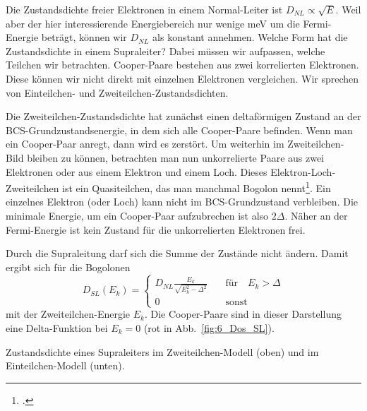 Die Zustandsdichte freier Elektronen in einem Normal-Leiter ist $D_{NL} \propto \sqrt{E}$. Weil aber der hier interessierende Energiebereich nur wenige meV um die Fermi-Energie beträgt, können wir $D_{NL}$ als konstant annehmen. Welche Form hat die Zustandsdichte in einem Supraleiter? Dabei müssen wir aufpassen, welche Teilchen wir betrachten. Cooper-Paare bestehen aus zwei korrelierten Elektronen. Diese können wir nicht direkt mit einzelnen Elektronen vergleichen. Wir sprechen von Einteilchen- und Zweiteilchen-Zustandsdichten.

Die Zweiteilchen-Zustandsdichte hat zunächst einen deltaförmigen Zustand an der BCS-Grundzustandsenergie, in dem sich alle Cooper-Paare befinden. Wenn man ein Cooper-Paar anregt, dann wird es zerstört. Um weiterhin im Zweiteilchen-Bild bleiben zu können, betrachten man nun unkorrelierte Paare aus zwei Elektronen oder aus einem Elektron und einem Loch. 
 Dieses Elektron-Loch-Zweiteilchen ist ein Quasiteilchen, das  man manchmal Bogolon nennt\footcite{Kopitzki_FK}. Ein einzelnes Elektron (oder Loch) kann nicht im BCS-Grundzustand verbleiben. Die minimale Energie, um ein Cooper-Paar aufzubrechen ist also  $2\Delta$. Näher an der Fermi-Energie ist kein Zustand für die unkorrelierten Elektronen frei.

Durch die Supraleitung darf sich die Summe der Zustände nicht ändern. Damit ergibt sich für die Bogolonen 
\begin{equation}
    D_{SL}(E_k) = \left\{ 
    \begin{matrix}
    D_{NL} \frac{E_k}{\sqrt{E_k^2 - \Delta^2}} \quad &\text{für} \quad E_k > \Delta \\
     0 & \text{sonst} 
    \end{matrix}
    \right. \label{eq:6_Dos_SL}
\end{equation}
mit der Zweiteilchen-Energie $E_k$. Die Cooper-Paare sind in dieser Darstellung eine Delta-Funktion bei $E_k = 0$ (rot in Abb.~\ref{fig:6_Dos_SL}).

\begin{marginfigure}[-40mm]


    \caption{Zustandsdichte eines Supraleiters im Zweiteilchen-Modell (oben) und im Einteilchen-Modell (unten).}
    \label{fig:6_Dos_SL}
\end{marginfigure}

